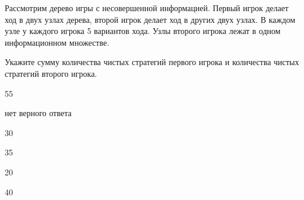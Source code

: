 
\begin{question}
Рассмотрим дерево игры с несовершенной информацией.
Первый игрок делает ход в двух узлах дерева, второй игрок делает ход в других двух узлах.
В каждом узле у каждого игрока 5 вариантов хода.
Узлы второго игрока лежат в одном информационном множестве.

Укажите сумму количества чистых стратегий первого игрока и количества чистых стратегий второго игрока.
\begin{answerlist}
  \item 55
  \item нет верного ответа
  \item 30
  \item 35
  \item 20
  \item 40
\end{answerlist}
\end{question}


